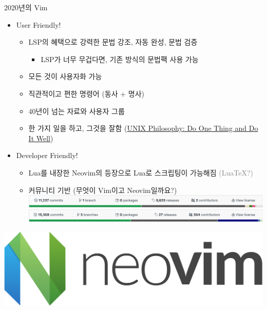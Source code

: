 \documentclass{beamer}
\begin{document}
\begin{frame}{2020년의 Vim}
  \begin{itemize}
    \item User Friendly!\pause
      \begin{itemize}
        \item LSP의 혜택으로 강력한 \alert{문법 강조}, \alert{자동 완성},
          \alert{문법 검증}\pause
          \begin{itemize}
            \item LSP가 너무 무겁다면, 기존 방식의 문법팩 사용 가능
          \end{itemize}
        \item 모든 것이 사용자화 가능\pause
        \item 직관적이고 편한 명령어 (동사 + 명사)\pause
        \item 40년이 넘는 자료와 사용자 그룹\pause
        \item 한 가지 일을 하고, 그것을 잘함
          (\href{https://en.wikipedia.org/wiki/Unix_philosophy}{UNIX Philosophy: Do One Thing and Do It Well})\pause
      \end{itemize}
    \item Developer Friendly!\pause
      \begin{itemize}
        \item Lua를 내장한 Neovim의 등장으로 Lua로 스크립팅이 가능해짐
          \textcolor{gray}{(Lua\TeX?)}\pause
        \item 커뮤니티 기반 (무엇이 Vim이고 Neovim일까요?)\\
          \vspace{5pt}\includegraphics[width=\linewidth]{figures/guess-what-1}\\
          \vspace{2pt}\includegraphics[width=\linewidth]{figures/guess-what-2}
      \end{itemize}
  \end{itemize}
\end{frame}

\begin{frame}
  \includegraphics[width=\linewidth]{figures/logo-neovim}
\end{frame}
\end{document}
